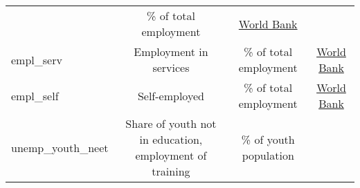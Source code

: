 \documentclass[]{article}
\begin{document}
\begin{longtable}[]{@{}lccc@{}}
\begin{minipage}[t]{0.36\columnwidth}
\end{minipage} & \begin{minipage}[t]{0.24\columnwidth}\centering\strut
\% of total employment\strut
\end{minipage} & \begin{minipage}[t]{0.15\columnwidth}\centering\strut
\href{https://data.worldbank.org/indicator/SL.AGR.EMPL.ZS}{World
Bank}\strut
\end{minipage}\tabularnewline
\begin{minipage}[t]{0.14\columnwidth}\raggedright\strut
empl\_serv\strut
\end{minipage} & \begin{minipage}[t]{0.36\columnwidth}\centering\strut
Employment in services\strut
\end{minipage} & \begin{minipage}[t]{0.24\columnwidth}\centering\strut
\% of total employment\strut
\end{minipage} & \begin{minipage}[t]{0.15\columnwidth}\centering\strut
\href{https://data.worldbank.org/indicator/SL.SRV.EMPL.ZS}{World
Bank}\strut
\end{minipage}\tabularnewline
\begin{minipage}[t]{0.14\columnwidth}\raggedright\strut
empl\_self\strut
\end{minipage} & \begin{minipage}[t]{0.36\columnwidth}\centering\strut
Self-employed\strut
\end{minipage} & \begin{minipage}[t]{0.24\columnwidth}\centering\strut
\% of total employment\strut
\end{minipage} & \begin{minipage}[t]{0.15\columnwidth}\centering\strut
\href{https://data.worldbank.org/indicator/SL.EMP.SELF.ZS}{World
Bank}\strut
\end{minipage}\tabularnewline
\begin{minipage}[t]{0.14\columnwidth}\raggedright\strut
unemp\_youth\_neet\strut
\end{minipage} & \begin{minipage}[t]{0.36\columnwidth}\centering\strut
Share of youth not in education, employment of training\strut
\end{minipage} & \begin{minipage}[t]{0.24\columnwidth}\centering\strut
\% of youth population\strut
\end{minipage} & \begin{minipage}[t]{0.15\columnwidth}\centering\strut

\end{minipage}
\end{longtable}
\end{document}
